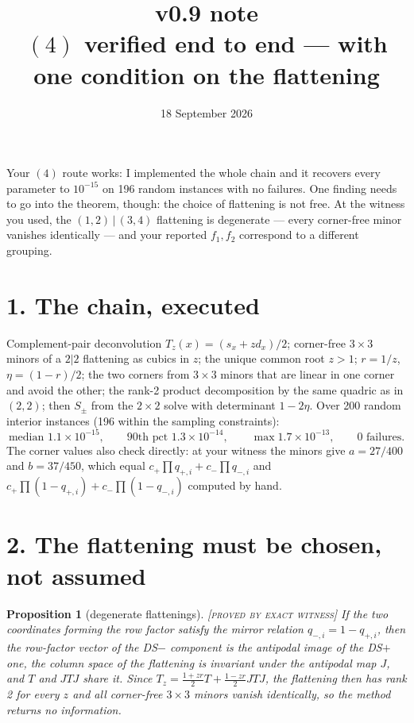 \documentclass[11pt]{article}
\title{\textbf{v0.9 note}\\[2pt]
\large $(4)$ verified end to end --- with one condition on the flattening}
\author{18 September 2026}
\date{}
\newtheorem{proposition}{Proposition}
\theoremstyle{remark}
\newcommand{\status}[1]{\hfill{\normalfont\small\textsc{[#1]}}}
\begin{document}
\maketitle
\vspace{-2.5em}

Your $(4)$ route works: I implemented the whole chain and it recovers every parameter to $10^{-15}$ on 196 random instances with no failures. One finding needs to go into the theorem, though: the choice of flattening is not free. At the witness you used, the $(1,2)\,|\,(3,4)$ flattening is degenerate --- every corner-free minor vanishes identically --- and your reported $f_1,f_2$ correspond to a different grouping.

\section*{1. The chain, executed}

Complement-pair deconvolution $T_z(x)=(s_x+zd_x)/2$; corner-free $3\times3$ minors of a $2|2$ flattening as cubics in $z$; the unique common root $z>1$; $r=1/z$, $\eta=(1-r)/2$; the two corners from $3\times3$ minors that are linear in one corner and avoid the other; the rank-2 product decomposition by the same quadric as in $(2,2)$; then $S_\pm$ from the $2\times2$ solve with determinant $1-2\eta$. Over 200 random interior instances (196 within the sampling constraints):
\[
\text{median }1.1\times10^{-15},\qquad 90\text{th pct }1.3\times10^{-14},\qquad \max 1.7\times10^{-13},\qquad\text{0 failures.}
\]
The corner values also check directly: at your witness the minors give $a=27/400$ and $b=37/450$, which equal $c_+\prod q_{+,i}+c_-\prod q_{-,i}$ and $c_+\prod(1-q_{+,i})+c_-\prod(1-q_{-,i})$ computed by hand.

\section*{2. The flattening must be chosen, not assumed}

\begin{proposition}[degenerate flattenings]\status{proved by exact witness}
If the two coordinates forming the row factor satisfy the mirror relation $q_{-,i}=1-q_{+,i}$, then the row-factor vector of the DS$-$ component is the antipodal image of the DS$+$ one, the column space of the flattening is invariant under the antipodal map $J$, and $T$ and $JTJ$ share it. Since $T_z=\tfrac{1+zr}{2}T+\tfrac{1-zr}{2}JTJ$, the flattening then has rank 2 for \emph{every} $z$ and all corner-free $3\times3$ minors vanish identically, so the method returns no information.
\end{proposition}
\end{document}
